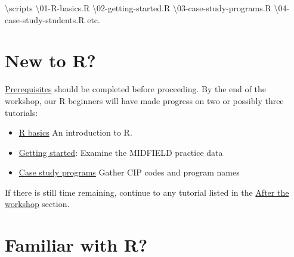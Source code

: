 \documentclass[
]{book}
\newenvironment{Shaded}{\begin{snugshade}}{\end{snugshade}}
\newcommand{\DecValTok}[1]{\textcolor[rgb]{0.00,0.00,0.81}{#1}}
\newcommand{\NormalTok}[1]{#1}
\newcommand{\SpecialCharTok}[1]{\textcolor[rgb]{0.00,0.00,0.00}{#1}}
\providecommand{\tightlist}{%
  \setlength{\itemsep}{0pt}\setlength{\parskip}{0pt}}
\begin{document}
\begin{Shaded}
\begin{Highlighting}[]
\NormalTok{        \textbackslash{}scripts    }
\NormalTok{            \textbackslash{}}\DecValTok{01}\SpecialCharTok{{-}}\NormalTok{R}\SpecialCharTok{{-}}\NormalTok{basics.R    }
\NormalTok{            \textbackslash{}}\DecValTok{02}\SpecialCharTok{{-}}\NormalTok{getting}\SpecialCharTok{{-}}\NormalTok{started.R    }
\NormalTok{            \textbackslash{}}\DecValTok{03}\SpecialCharTok{{-}}\NormalTok{case}\SpecialCharTok{{-}}\NormalTok{study}\SpecialCharTok{{-}}\NormalTok{programs.R    }
\NormalTok{            \textbackslash{}}\DecValTok{04}\SpecialCharTok{{-}}\NormalTok{case}\SpecialCharTok{{-}}\NormalTok{study}\SpecialCharTok{{-}}\NormalTok{students.R     }
\NormalTok{            etc.  }
\end{Highlighting}
\end{Shaded}

\hypertarget{new-to-r}{%
\section{New to R?}\label{new-to-r}}

\protect\hyperlink{prerequisites}{Prerequisites} should be completed before proceeding. By the end of the workshop, our R beginners will have made progress on two or possibly three tutorials:

\begin{itemize}
\tightlist
\item
  \protect\hyperlink{r-basics}{R basics} An introduction to R.
\item
  \href{https://midfieldr.github.io/midfieldr/articles/art-000-getting-started.html}{Getting started}: Examine the MIDFIELD practice data\\
\item
  \href{https://midfieldr.github.io/midfieldr/articles/art-110-case-study-programs.html}{Case study programs} Gather CIP codes and program names
\end{itemize}

If there is still time remaining, continue to any tutorial listed in the \protect\hyperlink{after-the-workshop}{After the workshop} section.

\hypertarget{familiar-with-r}{%
\section{Familiar with R?}\label{familiar-with-r}}
\end{document}
